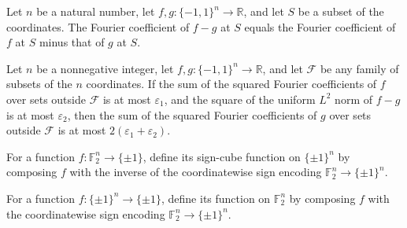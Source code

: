 \begin{theorem}
\label{FABL.fourierCoeff_sub}
\leanok
{}
Let $n$ be a natural number, let $f,g:\{-1,1\}^n\to\mathbb R$, and let $S$ be a
subset of the coordinates. The Fourier coefficient of $f-g$ at $S$ equals the Fourier
coefficient of $f$ at $S$ minus that of $g$ at $S$.
\end{theorem}

\begin{theorem}
\label{FABL.IsFourierSpectrumConcentratedOn.transfer_of_uniformLpNorm_sub_sq_le}
\leanok
{}
Let $n$ be a nonnegative integer, let $f,g:\{−1,1\}^n\to\mathbb R$, and let
$\mathcal F$ be any family of subsets of the $n$ coordinates. If the sum of the squared
Fourier coefficients of $f$ over sets outside $\mathcal F$ is at most $\varepsilon_1$,
and the square of the uniform $L^2$ norm of $f-g$ is at most $\varepsilon_2$, then the
sum of the squared Fourier coefficients of $g$ over sets outside $\mathcal F$ is at
most $2(\varepsilon_1+\varepsilon_2)$.
\end{theorem}

\begin{definition}
\label{FABL.booleanFunctionOfBinary}
\leanok
{}
For a function $f:\mathbb{F}_2^n\to\{\pm1\}$, define its sign-cube function on
$\{\pm1\}^n$ by composing $f$ with the inverse of the coordinatewise sign encoding
$\mathbb{F}_2^n\to\{\pm1\}^n$.
\end{definition}

\begin{definition}
\label{FABL.binaryOfBooleanFunction}
\leanok
{}
For a function $f:\{\pm1\}^n\to\{\pm1\}$, define its function on $\mathbb{F}_2^n$ by
composing $f$ with the coordinatewise sign encoding $\mathbb{F}_2^n\to\{\pm1\}^n$.
\end{definition}

